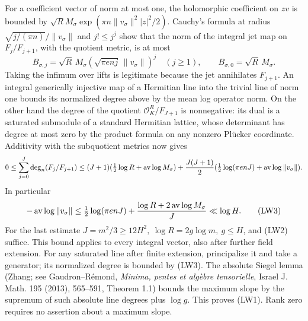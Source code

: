 For a coefficient vector of norm at most one, the holomorphic
coefficient on \(zv\) is bounded by
\(\sqrt R M_\sigma\exp(\pi n\|v_\sigma\|^2 |z|^2/2)\).
Cauchy's formula at radius \(\sqrt{j/(\pi n)}/\|v_\sigma\|\)
and \(j!\le j^j\) show that the norm of the integral jet map
on \(F_j/F_{j+1}\), with the quotient metric, is at most
\[
 B_{\sigma,j}=\sqrt R\, M_\sigma
         (\sqrt{\pi e n j}\,\|v_\sigma\|)^j
 \quad (j\ge1),\qquad B_{\sigma,0}=\sqrt R\, M_\sigma .
\]
Taking the infimum over lifts is legitimate because the jet
annihilates \(F_{j+1}\). An integral generically injective map
of a Hermitian line into the trivial line of norm one bounds
its normalized degree above by the mean log operator norm.
On the other hand the degree of the quotient
\(\mathcal O_K^R/F_{J+1}\) is nonnegative: its dual is a
saturated submodule of a standard Hermitian lattice, whose
determinant has degree at most zero by the product formula
on any nonzero Pl\"ucker coordinate. Additivity with the
subquotient metrics now gives
\[
 0\le\sum_{j=0}^J\deg_n(F_j/F_{j+1})
 \le (J+1)(\tfrac12\log R+\mathop{\rm av}\log M_\sigma)
 +\frac{J(J+1)}2
       (\tfrac12\log(\pi e n J)+\mathop{\rm av}\log\|v_\sigma\|).
\]
In particular
\[
 -\mathop{\rm av}\log\|v_\sigma\|
 \le \tfrac12\log(\pi e n J)
       +\frac{\log R+2\mathop{\rm av}\log M_\sigma}{J}
 \ll\log H.                                           \tag{LW3}
\]
For the last estimate \(J=m^2/3\ge12H^2,\ 
\log R=2g\log m,\ g\le H\), and (LW2) suffice.
This bound applies to every integral vector, also after further
field extension. For any saturated line after finite extension,
principalize it and take a generator; its normalized degree is
bounded by (LW3). The absolute Siegel lemma (Zhang; see
Gaudron--R\'emond, \emph{Minima, pentes et alg\`ebre
tensorielle}, Israel J. Math. 195 (2013), 565--591,
Theorem 1.1) bounds the maximum slope by the supremum of such
absolute line degrees plus \(\log g\). This proves (LW1).
Rank zero requires no assertion about a maximum slope.

